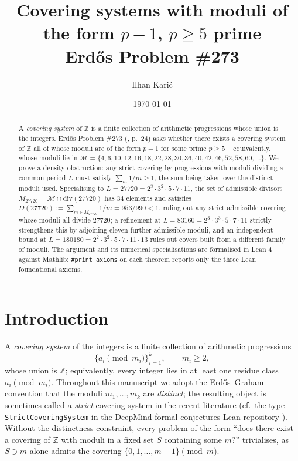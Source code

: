 \documentclass[11pt,a4paper]{article}
\title{Covering systems with moduli of the form $p-1$, $p \geq 5$ prime\\
\large{Erdős Problem \#273}}
\author{Ilhan Karić}
\date{\today}
\theoremstyle{plain}
\theoremstyle{definition}
\theoremstyle{remark}
\begin{document}
\maketitle

\begin{abstract}
A \emph{covering system} of $\mathbb{Z}$ is a finite collection of
arithmetic progressions whose union is the integers. Erdős Problem
\#273 (\cite{ErdosGraham1980}, p.~24) asks whether there exists a
covering system of $\mathbb{Z}$ all of whose moduli are of the form
$p - 1$ for some prime $p \geq 5$ -- equivalently, whose moduli lie
in $\mathcal{M} = \{4, 6, 10, 12, 16, 18, 22, 28, 30, 36, 40, 42,
46, 52, 58, 60, \ldots\}$. We prove a density obstruction: any
strict covering by progressions with moduli dividing a common
period $L$ must satisfy $\sum_{m} 1/m \geq 1$, the sum being taken
over the distinct moduli used. Specialising to $L = 27720 = 2^3
\cdot 3^2 \cdot 5 \cdot 7 \cdot 11$, the set of admissible divisors
$M_{27720} = \mathcal{M} \cap \mathrm{div}(27720)$ has $34$ elements
and satisfies $D(27720) := \sum_{m \in M_{27720}} 1/m = 953/990 <
1$, ruling out any strict admissible covering whose moduli all
divide $27720$; a refinement at $L = 83160 = 2^3 \cdot 3^3 \cdot 5
\cdot 7 \cdot 11$ strictly strengthens this by adjoining eleven
further admissible moduli, and an independent bound at $L = 180180 =
2^2 \cdot 3^2 \cdot 5 \cdot 7 \cdot 11 \cdot 13$ rules out covers
built from a different family of moduli. The argument and its
numerical specialisations are formalised in Lean 4 against Mathlib;
\texttt{\#print axioms} on each theorem reports only the three Lean
foundational axioms.
\end{abstract}

\section{Introduction}
\label{sec:intro}

A \emph{covering system} of the integers is a finite collection of
arithmetic progressions
\[
  \{ a_i \pmod{m_i} \}_{i=1}^{k}, \qquad m_i \geq 2,
\]
whose union is $\mathbb{Z}$; equivalently, every integer lies in at
least one residue class $a_i \pmod{m_i}$. Throughout this manuscript
we adopt the Erdős--Graham convention that the moduli $m_1, \ldots,
m_k$ are \emph{distinct}; the resulting object is sometimes called a
\emph{strict} covering system in the recent literature (cf.\ the
type \texttt{StrictCoveringSystem} in the DeepMind formal-conjectures
Lean repository \cite{FormalConjectures}). Without the distinctness
constraint, every problem of the form ``does there exist a covering
of $\mathbb{Z}$ with moduli in a fixed set $S$ containing some $m$?''
trivialises, as $S \ni m$ alone admits the covering $\{0, 1, \ldots,
m - 1\} \pmod{m}$.
\end{document}
